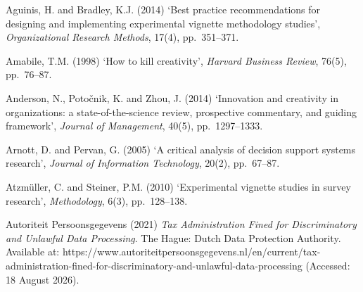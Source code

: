 \documentclass[11pt,a4paper]{article}
\numberwithin{figure}{section}
\numberwithin{table}{section}
\begin{document}
{\small{}
\noindent\hypertarget{ref1}{}\begin{minipage}[t]{\dimexpr\linewidth-1.05cm\relax}Aguinis, H. and Bradley, K.J. (2014) `Best practice recommendations for designing and implementing experimental vignette methodology studies', \emph{Organizational Research Methods}, 17(4), pp.~351--371.\end{minipage}\par\vspace{4pt}
\noindent\hypertarget{ref2}{}\begin{minipage}[t]{\dimexpr\linewidth-1.05cm\relax}Amabile, T.M. (1998) `How to kill creativity', \emph{Harvard Business Review}, 76(5), pp.~76--87.\end{minipage}\par\vspace{4pt}
\noindent\hypertarget{ref3}{}\begin{minipage}[t]{\dimexpr\linewidth-1.05cm\relax}Anderson, N., Poto\v{c}nik, K. and Zhou, J. (2014) `Innovation and creativity in organizations: a state-of-the-science review, prospective commentary, and guiding framework', \emph{Journal of Management}, 40(5), pp.~1297--1333.\end{minipage}\par\vspace{4pt}
\noindent\hypertarget{ref4}{}\begin{minipage}[t]{\dimexpr\linewidth-1.05cm\relax}Arnott, D. and Pervan, G. (2005) `A critical analysis of decision support systems research', \emph{Journal of Information Technology}, 20(2), pp.~67--87.\end{minipage}\par\vspace{4pt}
\noindent\hypertarget{ref5}{}\begin{minipage}[t]{\dimexpr\linewidth-1.05cm\relax}Atzm\"{u}ller, C. and Steiner, P.M. (2010) `Experimental vignette studies in survey research', \emph{Methodology}, 6(3), pp.~128--138.\end{minipage}\par\vspace{4pt}
\noindent\hypertarget{ref6}{}\begin{minipage}[t]{\dimexpr\linewidth-1.05cm\relax}Autoriteit Persoonsgegevens (2021) \emph{Tax Administration Fined for Discriminatory and Unlawful Data Processing}. The Hague: Dutch Data Protection Authority. Available at: https://www.autoriteitpersoonsgegevens.nl/en/current/tax-administration-fined-for-discriminatory-and-unlawful-data-processing (Accessed: 18 August 2026).\end{minipage}\par\vspace{4pt}
}
\end{document}
